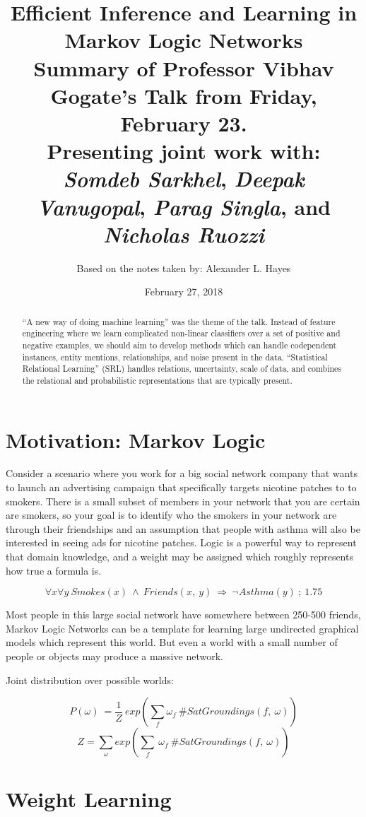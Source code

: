\documentclass{article}
\title{
    Efficient Inference and Learning in Markov Logic Networks\\
    \large Summary of Professor Vibhav Gogate's Talk from Friday, February 23.\\
           Presenting joint work with:\\
           \textit{Somdeb Sarkhel}, \textit{Deepak Vanugopal}, \textit{Parag Singla}, and \textit{Nicholas Ruozzi}
}
\author{Based on the notes taken by: Alexander L. Hayes}
\date{February 27, 2018}
\begin{document}
\maketitle


\begin{abstract}
``A new way of doing machine learning'' was the theme of the talk. Instead of feature engineering where we learn complicated non-linear classifiers over a set of positive and negative examples, we should aim to develop methods which can handle codependent instances, entity mentions, relationships, and noise present in the data.  ``Statistical Relational Learning'' (SRL) handles relations, uncertainty, scale of data, and combines the relational and probabilistic representations that are typically present.
\end{abstract}

\section{Motivation: Markov Logic}

Consider a scenario where you work for a big social network company that wants to launch an advertising campaign that specifically targets nicotine patches to to smokers. There is a small subset of members in your network that you are certain are smokers, so your goal is to identify who the smokers in your network are through their friendships and an assumption that people with asthma will also be interested in  seeing ads for nicotine patches. Logic is a powerful way to represent that domain knowledge, and a weight may be assigned which roughly represents how true a formula is.

$$\forall x \forall y\ Smokes(x)\ \land\ Friends(x,\ y)\ \Longrightarrow\ \neg Asthma(y)\ ;\ 1.75$$

Most people in this large social network have somewhere between 250-500 friends, Markov Logic Networks can be a template for learning large undirected graphical models which represent this world. But even a world with a small number of people or objects may produce a massive network.

Joint distribution over possible worlds:

$$P(\omega)\ = \frac{1}{Z}\ exp(\sum_{f} \omega_f\ \#SatGroundings(f,\ \omega))$$
$$Z = \sum_{\omega} exp(\sum_{f}\ \omega_f\ \#SatGroundings(f,\ \omega))$$

\section{Weight Learning}
\end{document}

